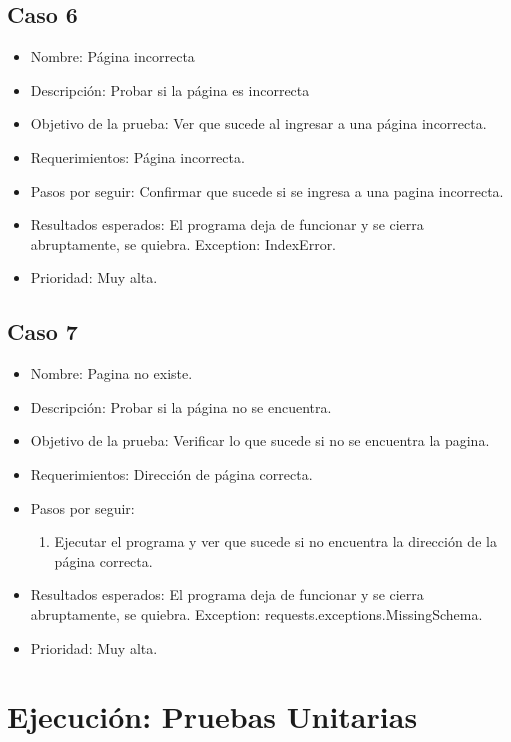 \documentclass[conference]{IEEEtran}
\begin{document}
\subsection*{Caso 6}
\begin{itemize}
\item Nombre: Página incorrecta
\item Descripción: Probar si la página es incorrecta
\item Objetivo de la prueba: Ver que sucede al ingresar a una página incorrecta.
\item Requerimientos: Página incorrecta.
\item Pasos por seguir: Confirmar que sucede si se ingresa a una pagina incorrecta.
\item Resultados esperados: El programa deja de funcionar y se cierra abruptamente, se quiebra. Exception: IndexError.
\item Prioridad: Muy alta.
\end{itemize}

\subsection*{Caso 7}

\begin{itemize}
\item Nombre: Pagina no existe.
\item Descripción: Probar si la página no se encuentra.
\item Objetivo de la prueba: Verificar lo que sucede si no se encuentra la pagina.
\item Requerimientos: Dirección de página correcta.
\item Pasos por seguir: 
\begin{enumerate}
\item Ejecutar el programa y ver que sucede si no encuentra la dirección de la página correcta.
\end{enumerate}
\item Resultados esperados: El programa deja de funcionar y se cierra abruptamente, se quiebra. Exception: requests.exceptions.MissingSchema.
\item Prioridad: Muy alta. 
\end{itemize}


\section{Ejecución: Pruebas Unitarias}
\end{document}
